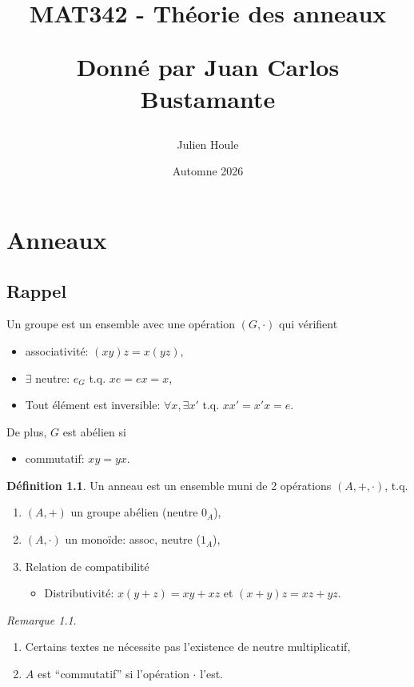 \documentclass{report}
\title{MAT342 - Th\'eorie des anneaux

	Donn\'e par Juan Carlos Bustamante}
\author{Julien Houle}
\date{Automne 2026}
\theoremstyle{definition}
\newtheorem*{dfn}{D\'efinition}
\theoremstyle{remark}
\newtheorem*{rmq}{Remarque}
\begin{document}
	\maketitle
	\tableofcontents
	\newpage
	\chapter{Anneaux}
	\section*{Rappel}
	Un groupe est un ensemble avec une op\'eration $(G,\cdot)$ qui v\'erifient
	\begin{itemize}
		\item associativit\'e: $(xy)z=x(yz)$,
		\item $\exists$ neutre: $e_G$ t.q. $xe=ex=x$,
		\item Tout \'el\'ement est inversible: $\forall x, \exists x'$ t.q. $xx'=x'x=e$.
	\end{itemize}

	De plus, $G$ est ab\'elien si
	\begin{itemize}
		\item commutatif: $xy=yx$.
	\end{itemize}

	\begin{dfn}
		Un anneau est un ensemble muni de 2 op\'erations $(A,+,\cdot)$, t.q.
		\begin{enumerate}
			\item $(A,+)$ un groupe ab\'elien (neutre $0_A$),
			\item $(A,\cdot)$ un mono\"ide: assoc, neutre ($1_A$),
			\item Relation de compatibilit\'e
			\begin{itemize}
				\item Distributivit\'e: $x(y+z)=xy+xz$ et $(x+y)z=xz+yz$.
			\end{itemize}
		\end{enumerate}
	\end{dfn}

	\begin{rmq}
		\begin{enumerate}
			\item Certains textes ne n\'ecessite pas l'existence de neutre multiplicatif,
			\item $A$ est ``commutatif'' si l'op\'eration $\cdot$ l'est.
		\end{enumerate}
	\end{rmq}
\end{document}
